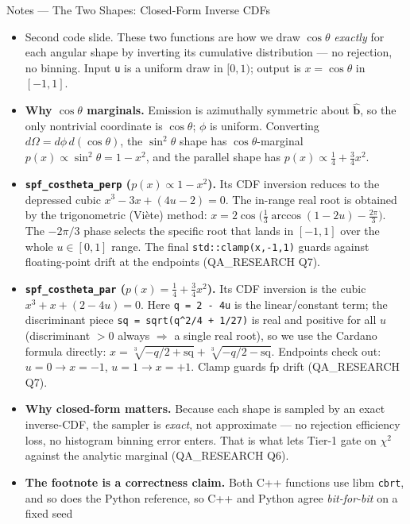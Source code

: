 \documentclass[11pt,aspectratio=169]{beamer}
\newcommand{\bhat}{\hat{\mathbf{b}}}
\begin{document}
\begin{frame}[allowframebreaks]{Notes --- The Two Shapes: Closed-Form Inverse CDFs}
{\color{red}\footnotesize
\begin{itemize}
\item Second code slide. These two functions are how we draw $\cos\theta$ \emph{exactly} for each
      angular shape by inverting its cumulative distribution --- no rejection, no binning. Input
      \texttt{u} is a uniform draw in $[0,1)$; output is $x=\cos\theta$ in $[-1,1]$.
\item \textbf{Why $\cos\theta$ marginals.} Emission is azimuthally symmetric about $\bhat$, so the
      only nontrivial coordinate is $\cos\theta$; $\phi$ is uniform. Converting $d\Omega =
      d\phi\,d(\cos\theta)$, the $\sin^2\theta$ shape has $\cos\theta$-marginal $p(x)\propto
      \sin^2\theta = 1-x^2$, and the parallel shape has $p(x)\propto \tfrac14+\tfrac34 x^2$.
\item \textbf{\texttt{spf\_costheta\_perp} ($p(x)\propto 1-x^2$).} Its CDF inversion reduces to the
      depressed cubic $x^3 - 3x + (4u-2)=0$. The in-range real root is obtained by the
      trigonometric (Vi\`ete) method: $x = 2\cos\!\big(\tfrac13\arccos(1-2u) - \tfrac{2\pi}{3}\big)$.
      The $-2\pi/3$ phase selects the specific root that lands in $[-1,1]$ over the whole
      $u\in[0,1]$ range. The final \texttt{std::clamp(x,-1,1)} guards against floating-point drift
      at the endpoints (QA\_RESEARCH Q7).
\item \textbf{\texttt{spf\_costheta\_par} ($p(x)=\tfrac14+\tfrac34 x^2$).} Its CDF inversion is the
      cubic $x^3 + x + (2-4u)=0$. Here \texttt{q = 2 - 4u} is the linear/constant term; the
      discriminant piece \texttt{sq = sqrt(q\^{}2/4 + 1/27)} is real and positive for all $u$
      (discriminant $>0$ always $\Rightarrow$ a single real root), so we use the Cardano formula
      directly: $x = \sqrt[3]{-q/2+\text{sq}} + \sqrt[3]{-q/2-\text{sq}}$. Endpoints check out:
      $u=0\to x=-1$, $u=1\to x=+1$. Clamp guards fp drift (QA\_RESEARCH Q7).
\item \textbf{Why closed-form matters.} Because each shape is sampled by an exact inverse-CDF, the
      sampler is \emph{exact}, not approximate --- no rejection efficiency loss, no histogram
      binning error enters. That is what lets Tier-1 gate on $\chi^2$ against the analytic marginal
      (QA\_RESEARCH Q6).
\item \textbf{The footnote is a correctness claim.} Both C++ functions use libm \texttt{cbrt}, and
      so does the Python reference, so C++ and Python agree \emph{bit-for-bit} on a fixed seed

\end{itemize}}
\end{frame}
\end{document}
